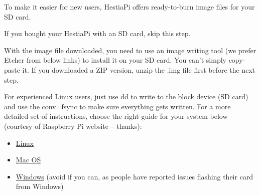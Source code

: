 To make it easier for new users, HestiaPi offers ready-to-burn image files for your SD card.

If you bought your HestiaPi with an SD card, skip this step.

With the image file downloaded, you need to use an image writing tool (we prefer
Etcher from below links) to install it on your SD card. You can't simply
copy-paste it. If you downloaded a ZIP version, unzip the .img file first before
the next step.

For experienced Linux users, just use dd to write to the block device (SD card)
and use the conv=fsync to make sure everything gets written.  For a more
detailed set of instructions, choose the right guide for your system below
(courtesy of Raspberry Pi website -- thanks):

\begin{itemize}
\item \href{http://www.raspberrypi.org/documentation/installation/installing-images/linux.md}{Linux}
\item \href{http://www.raspberrypi.org/documentation/installation/installing-images/mac.md}{Mac OS}
\item \href{http://www.raspberrypi.org/documentation/installation/installing-images/windows.md}{Windows} (avoid if you can, as people have reported issues flashing their card from Windows)
\end{itemize}

